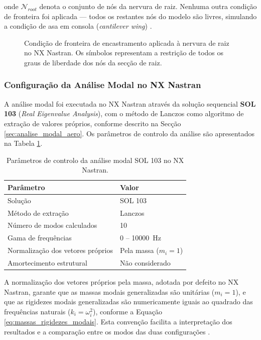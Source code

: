 \documentclass[a4paper,fleqn]{cas-sc}
\begin{document}
\noindent onde $\mathcal{N}_{root}$ denota o conjunto de nós da nervura de raiz. Nenhuma outra condição de fronteira foi aplicada --- todos os restantes nós do modelo são livres, simulando a condição de asa em consola (\textit{cantilever wing}) \cite{Bisplinghoff1996}.

\begin{figure}
    \centering
    \caption{Condição de fronteira de encastramento aplicada à nervura de raiz no NX Nastran. Os símbolos representam a restrição de todos os graus de liberdade dos nós da secção de raiz.}
    \label{fig:bc_nx}
\end{figure}

\subsubsection{Configuração da Análise Modal no NX Nastran}

A análise modal foi executada no NX Nastran através da solução sequencial \textbf{SOL 103} (\textit{Real Eigenvalue Analysis}), com o método de Lanczos como algoritmo de extração de valores próprios, conforme descrito na Secção \ref{sec:analise_modal_aero}. Os parâmetros de controlo da análise são apresentados na Tabela \ref{tab:sol103}.

\begin{table}
\centering
\caption{Parâmetros de controlo da análise modal SOL 103 
no NX Nastran.}
\label{tab:sol103}
\renewcommand{\arraystretch}{1.4}
\begin{tabularx}{\textwidth}{p{5cm} X}
\toprule
\textbf{Parâmetro} & \textbf{Valor} \\
\midrule
Solução                         & SOL 103 \\
Método de extração              & Lanczos \\
Número de modos calculados      & 10 \\
Gama de frequências             & $0$ -- \SI{10000}{\hertz} \\
Normalização dos vetores próprios & Pela massa ($m_i = 1$) \\
Amortecimento estrutural        & Não considerado \\
\bottomrule
\end{tabularx}
\end{table}

A normalização dos vetores próprios pela massa, adotada por defeito no NX Nastran, garante que as massas modais generalizadas são unitárias ($m_i = 1$), e que as rigidezes modais generalizadas são numericamente iguais ao quadrado das frequências naturais ($k_i = \omega_i^2$), conforme a Equação \eqref{eq:massas_rigidezes_modais}. Esta convenção facilita a interpretação dos resultados e a comparação entre os modos das duas configurações \cite{Nastran2014, Craig2006}.
\end{document}
